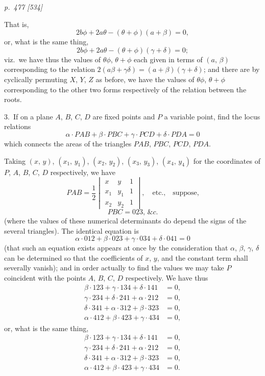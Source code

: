 \documentclass[11pt,a4paper]{book}
\begin{document}
\clearpage

\bigskip
\textit{p.~477 [534]}
\smallskip

\noindent
That is,
\[
2b\phi + 2a\theta - (\theta + \phi)(a + \beta) = 0,
\]
or, what is the same thing,
\[
2b\phi + 2a\theta - (\theta + \phi)(\gamma + \delta) = 0;
\]
viz.\ we have thus the values of $\theta\phi$, $\theta+\phi$ each given in terms of $(a,\,\beta)$ corresponding
to the relation $2(a\beta+\gamma\delta) = (a+\beta)(\gamma+\delta)$; and there are by cyclically permuting $X$, $Y$, $Z$
as before, we have the values of $\theta\phi$, $\theta+\phi$ corresponding to the other two forms
respectively of the relation between the roots.

\smallskip
\noindent\textsc{3.}\, If on a plane $A$, $B$, $C$, $D$ are fixed points and $P$ a variable point, find the
locus relations
\[
\alpha\cdot PAB + \beta\cdot PBC + \gamma\cdot PCD + \delta\cdot PDA = 0
\]
which connects the areas of the triangles $PAB$, $PBC$, $PCD$, $PDA$.

Taking $(x,\,y)$, $(x_1,\,y_1)$, $(x_2,\,y_2)$, $(x_3,\,y_3)$, $(x_4,\,y_4)$ for the coordinates of $P$, $A$, $B$, $C$, $D$ respectively,
we have
\[
PAB = \frac{1}{2}\begin{vmatrix} x & y & 1 \\ x_1 & y_1 & 1 \\ x_2 & y_2 & 1 \end{vmatrix}, \quad \text{etc.,}\quad \text{suppose,}
\]
\[
PBC = 023, \,\&c.
\]
(where the values of these numerical determinants do depend the signs of the several triangles).
The identical equation is
\[
\alpha\cdot 012 + \beta\cdot 023 + \gamma\cdot 034 + \delta\cdot 041 = 0
\]
(that such an equation exists appears at once by the consideration that $\alpha$, $\beta$, $\gamma$, $\delta$ can
be determined so that the coefficients of $x$, $y$, and the constant term shall severally
vanish); and in order actually to find the values we may take $P$ coincident with the
points $A$, $B$, $C$, $D$ respectively. We have thus
\begin{align*}
\beta\cdot 123 + \gamma\cdot 134 + \delta\cdot 141 &= 0, \\
\gamma\cdot 234 + \delta\cdot 241 + \alpha\cdot 212 &= 0, \\
\delta\cdot 341 + \alpha\cdot 312 + \beta\cdot 323 &= 0, \\
\alpha\cdot 412 + \beta\cdot 423 + \gamma\cdot 434 &= 0,
\end{align*}
or, what is the same thing,
\begin{align*}
\beta\cdot 123 + \gamma\cdot 134 + \delta\cdot 141 &= 0, \\
\gamma\cdot 234 + \delta\cdot 241 + \alpha\cdot 212 &= 0, \\
\delta\cdot 341 + \alpha\cdot 312 + \beta\cdot 323 &= 0, \\
\alpha\cdot 412 + \beta\cdot 423 + \gamma\cdot 434 &= 0.
\end{align*}
\end{document}

